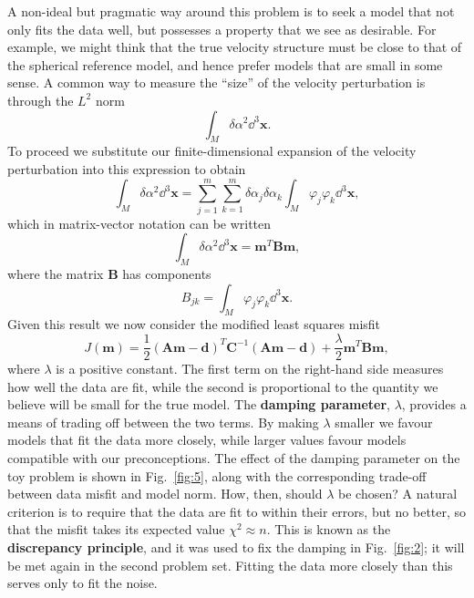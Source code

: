 A non-ideal but pragmatic way around this problem is to seek a model that not only fits the data well, but possesses
 a property that we see as desirable. For example, we might think that the true velocity structure must be close to that
  of the spherical reference model, and hence prefer models that are small in some sense. A common way to measure the
   ``size'' of the velocity perturbation is through the $L^{2}$ norm
\begin{equation}
    \int_{M} \delta\alpha^{2} \dd^{3}\mathbf{x}.
    \label{eq:20}
\end{equation}
To proceed we substitute our finite-dimensional expansion of the velocity perturbation into this expression to obtain
\begin{equation}
    \int_{M} \delta\alpha^{2} \dd^{3}\mathbf{x} = \sum_{j=1}^{m}\sum_{k=1}^{m} \delta\alpha_{j}\delta\alpha_{k} \int_{M}
     \varphi_{j}\varphi_{k} \dd^{3}\mathbf{x},
    \label{eq:21}
\end{equation}
which in matrix-vector notation can be written
\begin{equation}
    \int_{M} \delta\alpha^{2} \dd^{3}\mathbf{x} = \mathbf{m}^{T}\mathbf{B}\mathbf{m},
    \label{eq:22}
\end{equation}
where the matrix $\mathbf{B}$ has components
\begin{equation}
    B_{jk} = \int_{M} \varphi_{j}\varphi_{k} \dd^{3}\mathbf{x}.
    \label{eq:23}
\end{equation}
Given this result we now consider the modified least squares misfit
\begin{equation}
    J(\mathbf{m}) = \frac{1}{2} (\mathbf{A}\mathbf{m} - \mathbf{d})^{T} \mathbf{C}^{-1} (\mathbf{A}\mathbf{m} -
     \mathbf{d}) + \frac{\lambda}{2} \mathbf{m}^{T}\mathbf{B}\mathbf{m},
    \label{eq:24}
\end{equation}
where $\lambda$ is a positive constant. The first term on the right-hand side measures how well the data are fit, while
 the second is proportional to the quantity we believe will be small for the true model. The \textbf{damping parameter}, $\lambda$,
provides a means of trading off between the two terms. By making $\lambda$ smaller we favour models that fit the data more 
closely, while larger values favour models compatible with our preconceptions. The effect of the damping parameter on the 
toy problem is shown in Fig.~\ref{fig:5}, along with the corresponding trade-off between data misfit and model norm. 
How, then, should $\lambda$ be chosen? A natural criterion is to require that the data are fit to within their errors, 
but no better, so that the misfit takes its expected value $\chi^{2}\approx n$. This is known as the \textbf{discrepancy 
principle}, and it was used to fix the damping in Fig.~\ref{fig:2}; it will be met again in the second problem set. 
Fitting the data more closely than this serves only to fit the noise.

